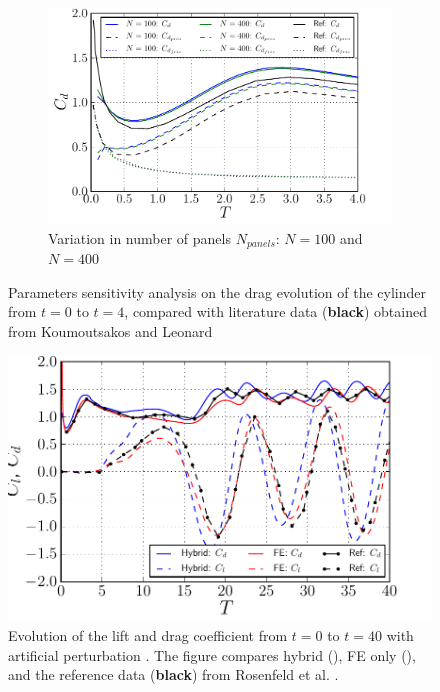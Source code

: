\begin{figure}[!p]
     \begin{subfigure}[b]{0.49\textwidth}
             \includegraphics[width=\textwidth]{./figures/validation/isc/hybrid_ISC_drag_nPanelComparison.pdf}
             \caption{Variation in number of panels $N_{panels}$: $N=100$ and $N=400$}
             \label{fig:hybrid_ISC_drag_nPanelComparison}
	 \end{subfigure}
    
     \caption{Parameters sensitivity analysis on the drag evolution of the cylinder from $t=0$ to $t=4$, compared with literature data (\textbf{black}) obtained from Koumoutsakos and Leonard \cite{Koumoutsakos1995a}}
     \label{fig:hybrid_ISC_parameterSensitivity}
	\end{figure}
	
	\begin{figure}[!p]
	\centering
	\includegraphics[width=0.6\linewidth]{./figures/validation/isc/hybrid_cylinder_LongRun_liftDrag.pdf}
	\caption{Evolution of the lift and drag coefficient from $t=0$ to $t=40$ with artificial perturbation \cite{Lecointe1984}. The figure compares hybrid ({}), FE only ({}), and the reference data (\textbf{black}) from Rosenfeld et al. \cite{MosheRosenFeldDochanKwak1991}.}
	\label{fig:hybrid_cylinder_LongRun_liftDrag}
	\end{figure}	

